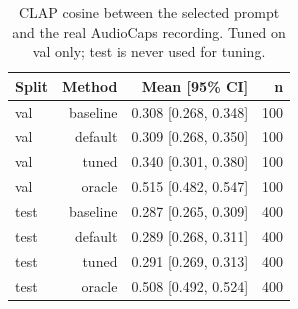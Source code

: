 \begin{table}[t]
\centering
\caption{CLAP cosine between the selected prompt and the real AudioCaps recording. Tuned on val only; test is never used for tuning.}
\label{tab:table2_prompt_selection}
\begin{tabular}{lrrr}
\toprule
Split & Method & Mean [95\% CI] & n \\
\midrule
val & baseline & 0.308 [0.268, 0.348] & 100 \\
val & default & 0.309 [0.268, 0.350] & 100 \\
val & tuned & 0.340 [0.301, 0.380] & 100 \\
val & oracle & 0.515 [0.482, 0.547] & 100 \\
test & baseline & 0.287 [0.265, 0.309] & 400 \\
test & default & 0.289 [0.268, 0.311] & 400 \\
test & tuned & 0.291 [0.269, 0.313] & 400 \\
test & oracle & 0.508 [0.492, 0.524] & 400 \\
\bottomrule
\end{tabular}
\end{table}
